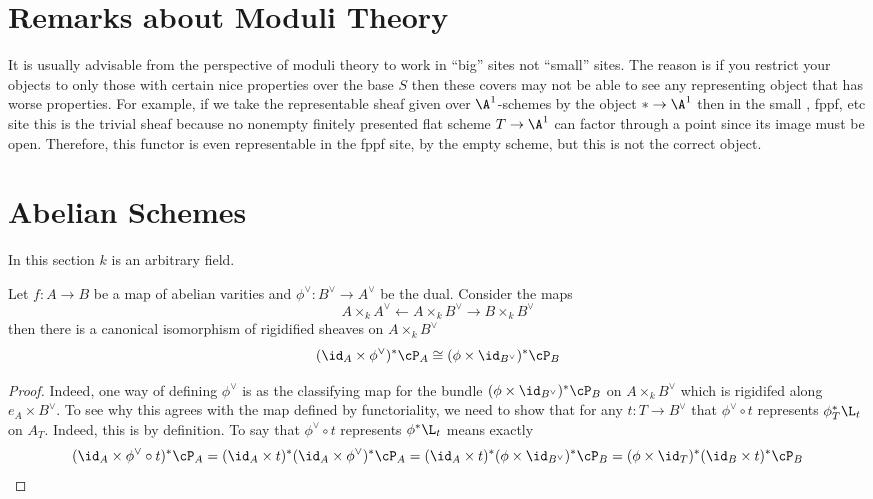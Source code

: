 \documentclass[12pt]{article}
\begin{document}
\section{Remarks about Moduli Theory}

It is usually advisable from the perspective of moduli theory to work in ``big'' sites not ``small'' sites. The reason is if you restrict your objects to only those with certain nice properties over the base $S$ then these covers may not be able to see any representing object that has worse properties. For example, if we take the representable sheaf given over $\A^1$-schemes by the object $* \to \A^1$ then in the small \etale, fppf, etc site this is the trivial sheaf because no nonempty finitely presented flat scheme $T \to \A^1$ can factor through a point since its image must be open. Therefore, this functor is even representable in the fppf site, by the empty scheme, but this is not the correct object. 

\section{Abelian Schemes}

In this section $k$ is an arbitrary field.

\begin{lemma}
Let $f : A \to B$ be a map of abelian varities and $\phi^\vee : B^\vee \to A^\vee$ be the dual. Consider the maps
\[ A \times_k A^\vee \leftarrow A \times_k B^\vee \to B \times_k B^\vee \]
then there is a canonical isomorphism of rigidified sheaves on $A \times_k B^\vee$
\[ (\id_A \times \phi^\vee)^* \cP_A \cong (\phi \times \id_{B^\vee})^* \cP_B \]
\end{lemma}

\begin{proof}
Indeed, one way of defining $\phi^\vee$ is as the classifying map for the bundle $(\phi \times \id_{B^\vee})^* \cP_B$ on $A \times_k B^\vee$ which is rigidifed along $e_A \times B^\vee$. To see why this agrees with the map defined by functoriality, we need to show that for any $t : T \to B^\vee$ that $\phi^\vee \circ t$ represents $\phi^*_T \L_t$ on $A_T$. Indeed, this is by definition. To say that $\phi^\vee \circ t$ represents $\phi^* \L_t$ means exactly
\[ (\id_A \times \phi^\vee \circ t)^* \cP_A = (\id_A \times t)^* (\id_A \times \phi^\vee)^* \cP_A = (\id_A \times t)^* (\phi \times \id_{B^\vee})^* \cP_B = (\phi \times \id_T)^* (\id_B \times t)^* \cP_B \]
\end{proof}
\end{document}
